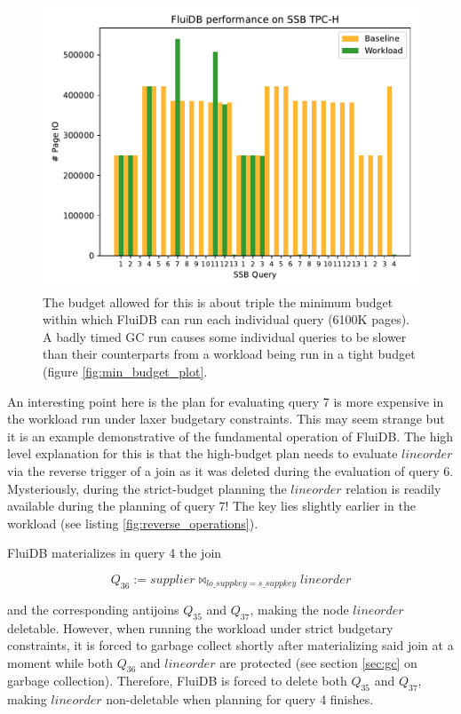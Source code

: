 \begin{figure}[H]
\centering
\includegraphics[width=.9\linewidth]{./plans/io_perf_61000.pdf}

\caption{\label{fig:large_budget_plot} \ioperfdescr The budget
  allowed for this is about triple the minimum budget within which
  FluiDB can run each individual query (6100K pages). A badly timed GC
  run causes some individual queries to be slower than their
  counterparts from a workload being run in a tight budget (figure
  \ref{fig:min_budget_plot}.}
\end{figure}

An interesting point here is the plan for evaluating query 7 is more
expensive in the workload run under laxer budgetary constraints. This
may seem strange but it is an example demonstrative of the fundamental
operation of FluiDB. The high level explanation for this is that the
high-budget plan needs to evaluate \(\mathit{lineorder}\) via the
reverse trigger of a join as it was deleted during the evaluation of
query 6. Mysteriously, during the strict-budget planning the
\(\mathit{lineorder}\) relation is readily available during the
planning of query 7! The key lies slightly earlier in the workload
(see listing \ref{fig:reverse_operations}).

FluiDB materializes in query 4 the join

\[
Q_{36} := \mathit{supplier} \Join_{\mathit{lo\_suppkey} = \mathit{s\_suppkey}} \mathit{lineorder}
\]

and the corresponding antijoins \(Q_{35}\) and \(Q_{37}\), making the
node \(\mathit{lineorder}\) deletable. However, when running the
workload under strict budgetary constraints, it is forced to garbage
collect shortly after materializing said join at a moment while both
\(Q_{36}\) and \(\mathit{lineorder}\) are protected (see section
\ref{sec:gc} on garbage collection). Therefore, FluiDB is forced to
delete both \(Q_{35}\) and \(Q_{37}\), making \(\mathit{lineorder}\)
non-deletable when planning for query 4 finishes.

